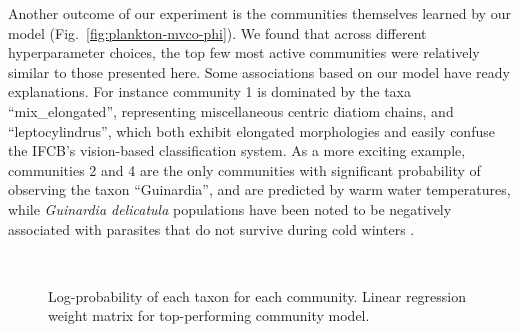 Another outcome of our experiment is the communities themselves learned by our model (Fig.~\ref{fig:plankton-mvco-phi}). We found that across different hyperparameter choices, the top few most active communities were relatively similar to those presented here. Some associations based on our model have ready explanations. For instance community 1 is dominated by the taxa ``mix\_elongated'', representing miscellaneous centric diatiom chains, and ``leptocylindrus'', which both exhibit elongated morphologies and easily confuse the IFCB's vision-based classification system. As a more exciting example, communities 2 and 4 are the only communities with significant probability of observing the taxon ``Guinardia'', and are predicted by warm water temperatures, while \emph{Guinardia delicatula} populations have been noted to be negatively associated with parasites that do not survive during cold winters \citep{peacock2014parasitic}.

\begin{figure}
    \begin{center}
        \\
    \end{center}

    \caption{
        \protect{} Log-probability of each taxon for each community.
        \protect{} Linear regression weight matrix for top-performing community model.
    }
    \label{fig:plankton-mvco-supplemental}
\end{figure}

